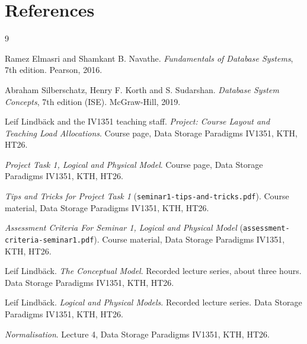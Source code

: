 \documentclass[a4paper]{scrartcl}
\renewcommand{\_}{\textunderscore\allowbreak}
\begin{document}
\section{References}
\label{sec:references}

\renewcommand{\refname}{}
\vspace{-2\baselineskip}
\begin{thebibliography}{9}

Ramez Elmasri and Shamkant B. Navathe.
\textit{Fundamentals of Database Systems}, 7th edition.
Pearson, 2016.

Abraham Silberschatz, Henry F. Korth and S. Sudarshan.
\textit{Database System Concepts}, 7th edition (ISE).
McGraw-Hill, 2019.

Leif Lindbäck and the IV1351 teaching staff.
\textit{Project: Course Layout and Teaching Load Allocations}.
Course page, Data Storage Paradigms IV1351, KTH, HT26.

\textit{Project Task 1, Logical and Physical Model}.
Course page, Data Storage Paradigms IV1351, KTH, HT26.

\textit{Tips and Tricks for Project Task 1} (\texttt{seminar1-tips-and-tricks.pdf}).
Course material, Data Storage Paradigms IV1351, KTH, HT26.

\textit{Assessment Criteria For Seminar 1, Logical and Physical Model}
(\texttt{assessment-criteria-seminar1.pdf}).
Course material, Data Storage Paradigms IV1351, KTH, HT26.

Leif Lindbäck.
\textit{The Conceptual Model}. Recorded lecture series, about three hours.
Data Storage Paradigms IV1351, KTH, HT26.

Leif Lindbäck.
\textit{Logical and Physical Models}. Recorded lecture series.
Data Storage Paradigms IV1351, KTH, HT26.

\textit{Normalisation}. Lecture 4, Data Storage Paradigms IV1351, KTH, HT26.

\end{thebibliography}
\end{document}
